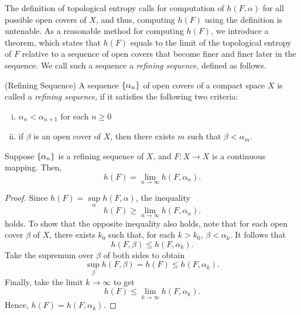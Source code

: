 \documentclass[12pt,twoside,draft]{book}
\begin{document}
The definition of topological entropy calls for computation of $h(F,\alpha)$ for all possible open covers of $X$, and thus, computing $h(F)$ using the definition is untenable.
As a reasonable method for computing $h(F)$, we introduce a theorem, which states that $h(F)$ equals to the limit of the topological entropy of $F$ relative to a sequence of open covers that become finer and finer later in the sequence.
We call such a sequence a \textit{refining sequence}, defined as follows.

\begin{definition}
  (Refining Sequence)
  A sequence $\left \{ \alpha_n \right \}$ of open covers of a compact space $X$ is called a \textit{refining sequence}, if it satisfies the following two criteria:
  \begin{enumerate}[(i)]
    \item $\alpha_n < \alpha_{n+1}$ for each $n\geq 0$
    \item if $\beta$ is an open cover of $X$, then there exists $m$ such that $\beta < \alpha_m$.
  \end{enumerate}
\end{definition}

\begin{theorem}
  Suppose $\left \{ \alpha_n \right \}$ is a refining sequence of $X$, and $F:X\to X$ is a continuous mapping.
  Then,
  \begin{equation*}
    h(F) = \lim\limits_{n\to \infty} h(F, \alpha_n).
  \end{equation*}
  \label{thm:t-ent-ref-seq}
  \begin{proof}
    Since $h(F) = \sup\limits_{\alpha} h(F, \alpha)$, the inequality
    \begin{equation*}
      h(F) \geq \lim\limits_{n\to \infty} h(F, \alpha_n).
    \end{equation*}
    holds.
    To show that the opposite inequality also holds, note that for each open cover $\beta$ of $X$, there exists $k_0$ such that, for each $k > k_0$, $\beta < \alpha_k$.
    It follows that
    \begin{equation*}
      h(F, \beta) \leq h(F, \alpha_k).
    \end{equation*}
    Take the supremum over $\beta$ of both sides to obtain
    \begin{equation*}
      \sup\limits_{\beta} h(F, \beta) = h(F) \leq h(F, \alpha_k).
    \end{equation*}
    Finally, take the limit $k \to \infty$ to get
    \begin{equation*}
      h(F) \leq \lim\limits_{k \to \infty} h(F, \alpha_k).
    \end{equation*}
    Hence, $h(F) = h(F, \alpha_k)$.
  \end{proof}
\end{theorem}
\end{document}
